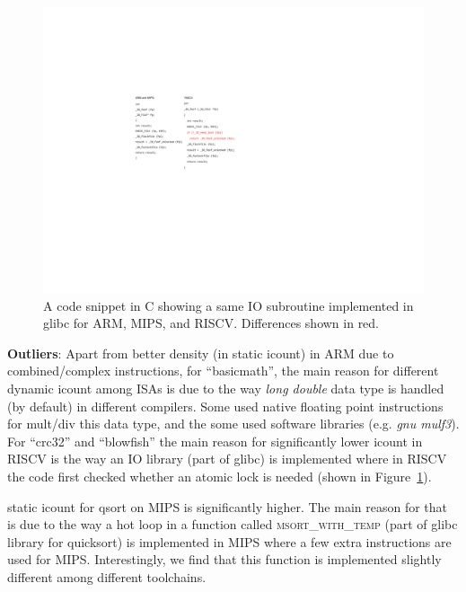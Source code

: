 \begin{figure}[]
	\centering
	\includegraphics[width=1\columnwidth]{figures/libc.pdf}
	\caption{A code snippet in C showing a same IO subroutine implemented in glibc for ARM, MIPS, and RISCV. Differences shown in red.}
	\label{fig:libc}
	\vspace{-1em}
\end{figure} 


\noindent \textbf{Outliers}: Apart from better density (in static icount) in ARM due to combined/complex instructions, for ``basicmath'', the main reason for different dynamic icount among ISAs is due to the way \textit{long double} data type is handled (by default) in different compilers. Some used native floating point instructions for mult/div this data type, and the some used software libraries (e.g. \textit{gnu mulf3}). For ``crc32'' and ``blowfish'' the main reason for significantly lower icount in RISCV is the way an IO library (part of glibc) is implemented where in RISCV the code first checked whether an atomic lock is needed (shown in Figure~\ref{fig:libc}). 


static icount for qsort on MIPS is significantly higher. The main reason for that is due to the way a hot loop in a function called \textsc{msort\_with\_temp} (part of glibc library for quicksort) is implemented in MIPS where a few extra instructions are used for MIPS. Interestingly, we find that this function is implemented slightly different among different toolchains. 

